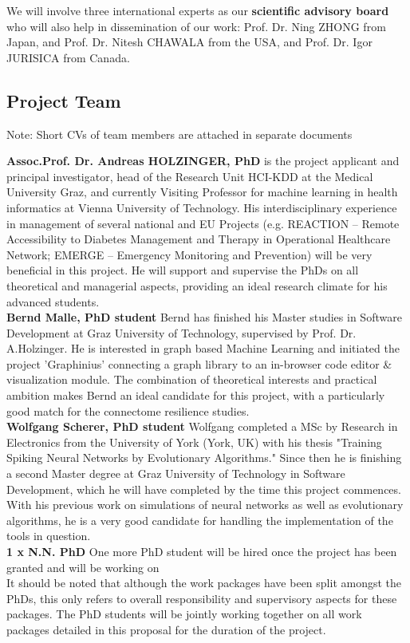 \documentclass[a4paper,11pt]{article}
\begin{document}
We will involve three international experts as our \textbf{scientific advisory board} who will also help in dissemination of our work: Prof. Dr. Ning ZHONG from Japan, and Prof. Dr. Nitesh CHAWALA from the USA, and Prof. Dr. Igor JURISICA from Canada.

\subsection{Project Team}
Note: Short CVs of team members are attached in separate documents

\textbf{Assoc.Prof. Dr. Andreas HOLZINGER, PhD} is the project applicant and principal investigator, head of the Research Unit HCI-KDD at the Medical University Graz, and currently Visiting Professor for machine learning in health informatics at Vienna University of Technology. His interdisciplinary experience in management of several national and EU Projects (e.g. REACTION – Remote Accessibility to Diabetes Management and Therapy in Operational Healthcare Network; EMERGE – Emergency Monitoring and Prevention) will be very beneficial in this project. He will support and supervise the PhDs on all theoretical and managerial aspects, providing an ideal research climate for his advanced students.
\\[0,2cm]
\textbf{Bernd Malle, PhD student}
Bernd has finished his Master studies in Software Development at Graz University of Technology, supervised by Prof. Dr. A.Holzinger. He is interested in graph based Machine Learning and initiated the project 'Graphinius' connecting a graph library to an in-browser code editor \& visualization module. The combination of theoretical interests and practical ambition makes Bernd an ideal candidate for this project, with a particularly good match for the connectome resilience studies.
\\[0,2cm]
\textbf{Wolfgang Scherer, PhD student}
Wolfgang completed a MSc by Research in Electronics from the University of York (York, UK) with his thesis "Training Spiking Neural Networks by Evolutionary Algorithms." Since then he is finishing a second Master degree at Graz University of Technology in Software Development, which he will have completed by the time this project commences. With his previous work on simulations of neural networks as well as evolutionary algorithms, he is a very good candidate for handling the implementation of the tools in question.
\\[0,2cm]
\textbf{1 x N.N. PhD} One more PhD student will be hired once the project has been granted and will be working on 
\\[0,2cm]
It should be noted that although the work packages have been split amongst the PhDs, this only refers to overall responsibility and supervisory aspects for these packages. The PhD students will be jointly working together on all work packages detailed in this proposal for the duration of the project.
\end{document}

